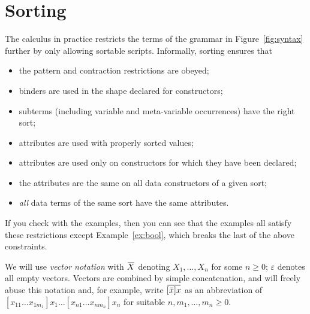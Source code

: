 \documentclass[letterpaper,11pt]{article}
\begin{document}


\section{\bhax Sorting}
\label{sec:sorting}

The \hax calculus in practice restricts the terms of the grammar in Figure~\ref{fig:syntax} further
by only allowing sortable scripts. Informally, sorting ensures that
\begin{itemize}
\item the pattern and contraction restrictions are obeyed;
\item binders are used in the shape declared for constructors;
\item subterms (including variable and meta-variable occurrences) have the right sort;
\item attributes are used with properly sorted values;
\item attributes are used only on constructors for which they have been declared;
\item the attributes are the same on all data constructors of a given sort;
\item \emph{all} data terms of the same sort have the same attributes.
\end{itemize}
If you check with the examples, then you can see that the examples all satisfy these restrictions
except Example~\ref{ex:bool}, which breaks the last of the above constraints. 

\begin{notation}[vectors]
  We will use \emph{vector notation} with $\ov{X}$ denoting $X_1,…,X_n$ for some $n≥0$; $ε$ denotes
  all empty vectors. Vectors are combined by simple concatenation, and will freely abuse this
  notation and, for example, write $\ov{[\ov{x}]x}$ as an abbreviation of
  $[x_{11}…x_{1m_1}]x_1…[x_{n1}…x_{nm_n}]x_n$ for suitable $n,m_1,…,m_n ≥ 0$.
\end{notation}
\end{document}
